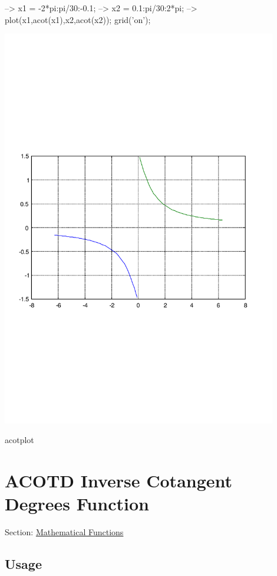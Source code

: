 \begin{DoxyVerbInclude}
--> x1 = -2*pi:pi/30:-0.1;
--> x2 = 0.1:pi/30:2*pi;
--> plot(x1,acot(x1),x2,acot(x2)); grid('on');
\end{DoxyVerbInclude}


 
\begin{DoxyImage}
\includegraphics[width=12cm]{acotplot}
\caption{acotplot}
\end{DoxyImage}
 \hypertarget{mathfunctions_acotd}{}\section{A\-C\-O\-T\-D Inverse Cotangent Degrees Function}\label{mathfunctions_acotd}
Section\-: \hyperlink{sec_mathfunctions}{Mathematical Functions} \hypertarget{vtkwidgets_vtkxyplotwidget_Usage}{}\subsection{Usage}\label{vtkwidgets_vtkxyplotwidget_Usage}
